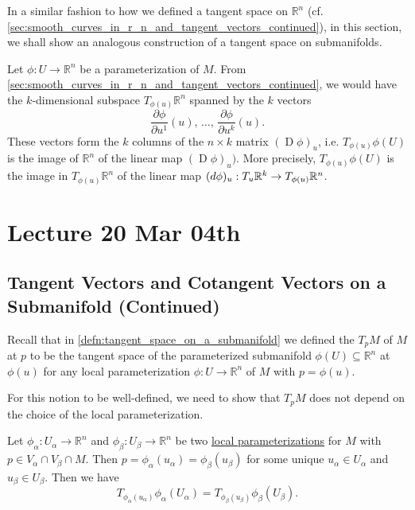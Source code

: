 \documentclass[notoc,notitlepage]{tufte-book}
\DeclareMathOperator{\D}{D}
\begin{document}
In a similar fashion to how we defined a tangent space on $\mathbb{R}^n$ (cf.
\cref{sec:smooth_curves_in_r_n_and_tangent_vectors_continued}), in
this section, we shall show an analogous construction of a tangent space on
submanifolds.

Let $\phi : U \to \mathbb{R}^n$ be a parameterization of $M$. From
\cref{sec:smooth_curves_in_r_n_and_tangent_vectors_continued}, we would have the
$k$-dimensional subspace $T_{\phi(u)} \mathbb{R}^n$ spanned by the $k$ vectors
\begin{equation*}
  \frac{\partial \phi}{\partial u^1} (u), \, \hdots, \, \frac{\partial
  \phi}{\partial u^k} (u).
\end{equation*}
These vectors form the $k$ columns of the $n \times k$ matrix $(\D \phi)_u$,
i.e. $T_{\phi(u)} \phi(U)$ is the image of $\mathbb{R}^n$ of the linear map $(\D
\phi)_u)$. More precisely, $T_{\phi(u)} \phi(U)$ is the image in $T_{\phi(u)}
\mathbb{R}^n$ of the linear map $(\mathop{}\!d{\phi})_u : T_u \mathbb{R}^k \to
T_{\phi(u)} \mathbb{R}^n$.



\chapter{Lecture 20 Mar 04th}%
\label{chp:lecture_20_mar_04th}

\section{Tangent Vectors and Cotangent Vectors on a Submanifold (Continued)}%
\label{sec:tangent_vectors_and_cotangent_vectors_on_a_submanifold_continued}

Recall that in \cref{defn:tangent_space_on_a_submanifold} we defined the
 $T_p M$ of $M$ at $p$ to be the tangent space of the
parameterized submanifold $\phi(U) \subseteq \mathbb{R}^n$ at $\phi(u)$ for any
local parameterization $\phi : U \to \mathbb{R}^n$ of $M$ with $p = \phi(u)$.

For this notion to be well-defined, we need to show that $T_p M$ does not depend
on the choice of the local parameterization.

\begin{propo}\label{propo:well_definedness_of_the_tangent_space_of_a_submanifold}
  Let $\phi_\alpha : U_\alpha \to \mathbb{R}^n$ and $\phi_\beta : U_\beta \to
  \mathbb{R}^n$ be two \hyperref[defn:local_parameterizations]{local
  parameterizations} for $M$ with $p \in V_\alpha \cap V_\beta \cap M$. Then $p =
  \phi_\alpha (u_\alpha) = \phi_\beta(u_\beta)$ for some unique $u_\alpha \in
  U_\alpha$ and $u_\beta \in U_\beta$. Then we have
  \begin{equation*}
    T_{\phi_{\alpha} (u_\alpha) } \phi_\alpha (U_\alpha) = T_{\phi_\beta(u_\beta)}
    \phi_\beta (U_\beta).
  \end{equation*}
\end{propo}
\end{document}
